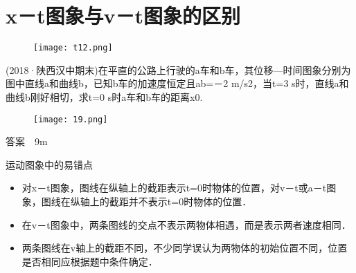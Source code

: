 \documentclass[cn,11pt]{elegantbook}
\begin{document}
   \section{x－t图象与v－t图象的区别}
   \begin{figure}[H]
      \centering
      \texttt{[image: t12.png]}
   \end{figure}
   \begin{example}
      (2018·陕西汉中期末)在平直的公路上行驶的a车和b车，其位移—时间图象分别为图中直线a和曲线b，已知b车的加速度恒定且ab=－2 m/s2，当t=3 s时，直线a和曲线b刚好相切，求t=0 s时a车和b车的距离x0.      

      \begin{figure}[htbp]
      \centering
      \texttt{[image: 19.png]}
   \end{figure}

      \begin{solution}
         答案　9m
         
      \end{solution}   
      
   \end{example}
   \begin{note}
      运动图象中的易错点
      \begin{itemize}
         \item 对x－t图象，图线在纵轴上的截距表示t=0时物体的位置，对v－t或a－t图象，图线在纵轴上的截距并不表示t=0时物体的位置．
         \item 在v－t图象中，两条图线的交点不表示两物体相遇，而是表示两者速度相同．
         \item 两条图线在v轴上的截距不同，不少同学误认为两物体的初始位置不同，位置是否相同应根据题中条件确定．
      \end{itemize}
      
   \end{note}
\end{document}

